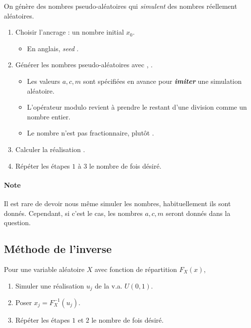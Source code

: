 \documentclass[10pt, french]{article}
\begin{document}
\begin{multicols*}{2}
\begin{algo2}
On génère des nombres pseudo-aléatoires qui \textit{simulent} des nombres réellement aléatoires.

\begin{enumerate}[label = \circled{\arabic*}{trueblue}]
	\item	Choisir l'ancrage : un nombre initial $x_{0}$.
		\begin{itemize}
		\item	En anglais, \og \textit{seed} \fg{}.
		\end{itemize}
	\item	Générer les nombres pseudo-aléatoires avec , .
		\begin{itemize}
		\item	Les valeurs $a, c, m$ sont spécifiées en avance pour \textbf{\textit{imiter}} une simulation aléatoire.
		\item	L'opérateur modulo revient à prendre le restant d'une division comme un nombre entier.
		\item	Le nombre n'est pas fractionnaire, plutôt \lfbox[conditions]{$x_{j + 1} \in [0, m)$}.
		\end{itemize}
	\item	Calculer la réalisation .
	\item	Répéter les étapes $1$ à $3$ le nombre de fois désiré.
\end{enumerate}

\paragraph{Note}	Il est rare de devoir nous même simuler les nombres, habituellement ils sont donnés. Cependant, si c'est le cas, les nombres $a, c, m$ seront donnés dans la question.
\end{algo2}


\subsection{Méthode de l'inverse}
\begin{algo2}
Pour une variable aléatoire $X$ avec fonction de répartition $F_{X}(x)$, 
\begin{enumerate}[label = \circled{\arabic*}{trueblue}]
	\item	Simuler une réalisation $u_{j}$ de la v.a. $U(0, 1)$.
	\item	Poser $x_{j} = F_{X}^{-1}(u_{j})$.
	\item	Répéter les étapes $1$ et $2$ le nombre de fois désiré.
\end{enumerate}
\end{algo2}



\end{multicols*}
\end{document}
